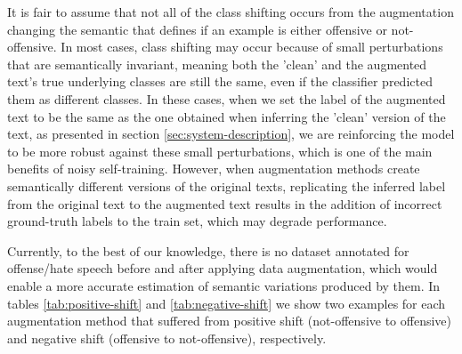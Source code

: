 \documentclass[11pt,a4paper]{article}
\begin{document}
\begin{table}[htb]
\centering
{}
\caption{\label{tab:label-shift}Average target class shift percentage on the weakly-labelled set. BT=Backtranslation, SS=Synonym Substitution, WS=Word Swap}
\end{table}










It is fair to assume that not all of the class shifting occurs from the augmentation changing the semantic that defines if an example is either offensive or not-offensive. In most cases, class shifting may occur because of small perturbations that are semantically invariant, meaning both the 'clean' and the augmented text's true underlying classes are still the same, even if the classifier predicted them as different classes. In these cases, when we set the label of the augmented text to be the same as the one obtained when inferring the 'clean' version of the text, as presented in section \ref{sec:system-description}, we are reinforcing the model to be more robust against these small perturbations, which is one of the main benefits of noisy self-training. However, when augmentation methods create semantically different versions of the original texts, replicating the inferred label from the original text to the augmented text results in the addition of incorrect ground-truth labels to the train set, which may degrade performance.

Currently, to the best of our knowledge, there is no dataset annotated for offense/hate speech before and after applying data augmentation, which would enable a more accurate estimation of semantic variations produced by them. In tables \ref{tab:positive-shift} and \ref{tab:negative-shift} we show two examples for each augmentation method that suffered from positive shift (not-offensive to offensive) and negative shift (offensive to not-offensive), respectively.
\end{document}
